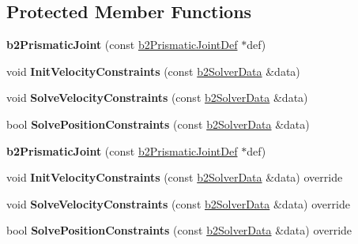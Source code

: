\subsection*{Protected Member Functions}
\begin{DoxyCompactItemize}
\item 
\mbox{\label{classb2PrismaticJoint_ab1586a2334f7e32137fbd7f807e249ca}} 
{\bfseries b2\+Prismatic\+Joint} (const \hyperlink{structb2PrismaticJointDef}{b2\+Prismatic\+Joint\+Def} $\ast$def)
\item 
\mbox{\label{classb2PrismaticJoint_a2178262be18a40c1aca79375ce7f4e7f}} 
void {\bfseries Init\+Velocity\+Constraints} (const \hyperlink{structb2SolverData}{b2\+Solver\+Data} \&data)
\item 
\mbox{\label{classb2PrismaticJoint_a05f935314127028e3ee6c8816e178aa0}} 
void {\bfseries Solve\+Velocity\+Constraints} (const \hyperlink{structb2SolverData}{b2\+Solver\+Data} \&data)
\item 
\mbox{\label{classb2PrismaticJoint_a3ce2a793c1e92df1205e4a704997bbf6}} 
bool {\bfseries Solve\+Position\+Constraints} (const \hyperlink{structb2SolverData}{b2\+Solver\+Data} \&data)
\item 
\mbox{\label{classb2PrismaticJoint_ab1586a2334f7e32137fbd7f807e249ca}} 
{\bfseries b2\+Prismatic\+Joint} (const \hyperlink{structb2PrismaticJointDef}{b2\+Prismatic\+Joint\+Def} $\ast$def)
\item 
\mbox{\label{classb2PrismaticJoint_a840e9885d49bf621c46df79733df21dc}} 
void {\bfseries Init\+Velocity\+Constraints} (const \hyperlink{structb2SolverData}{b2\+Solver\+Data} \&data) override
\item 
\mbox{\label{classb2PrismaticJoint_a028c0ca03ca8437606d1175ca8de63d6}} 
void {\bfseries Solve\+Velocity\+Constraints} (const \hyperlink{structb2SolverData}{b2\+Solver\+Data} \&data) override
\item 
\mbox{\label{classb2PrismaticJoint_ac841608a56e83f709e08b805ed8c92e3}} 
bool {\bfseries Solve\+Position\+Constraints} (const \hyperlink{structb2SolverData}{b2\+Solver\+Data} \&data) override
\end{DoxyCompactItemize}
